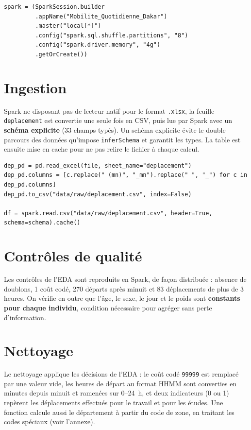 \documentclass[12pt,a4paper]{report}
\newcommand{\code}[1]{\texttt{\small #1}}
\newcommand{\1}{\mathbf{1}}
\begin{document}
\begin{lstlisting}[caption={Création de la session Spark},label={lst:session}]
spark = (SparkSession.builder
         .appName("Mobilite_Quotidienne_Dakar")
         .master("local[*]")
         .config("spark.sql.shuffle.partitions", "8")
         .config("spark.driver.memory", "4g")
         .getOrCreate())
\end{lstlisting}

\section{Ingestion}
Spark ne disposant pas de lecteur natif pour le format \code{.xlsx}, la feuille \code{deplacement} est convertie une seule fois en CSV, puis lue par Spark avec un \textbf{schéma explicite} (33 champs typés). Un schéma explicite évite le double parcours des données qu'impose \code{inferSchema} et garantit les types. La table est ensuite mise en cache pour ne pas relire le fichier à chaque calcul.

\begin{lstlisting}[caption={Lecture du CSV avec un schéma explicite},label={lst:ingestion}]
dep_pd = pd.read_excel(file, sheet_name="deplacement")
dep_pd.columns = [c.replace(" (mn)", "_mn").replace(" ", "_") for c in dep_pd.columns]
dep_pd.to_csv("data/raw/deplacement.csv", index=False)

df = spark.read.csv("data/raw/deplacement.csv", header=True, schema=schema).cache()
\end{lstlisting}

\section{Contrôles de qualité}
Les contrôles de l'EDA sont reproduits en Spark, de façon distribuée : absence de doublons, 1 coût codé, 270 départs après minuit et 83 déplacements de plus de 3 heures. On vérifie en outre que l'âge, le sexe, le jour et le poids sont \textbf{constants pour chaque individu}, condition nécessaire pour agréger sans perte d'information.

\section{Nettoyage}
Le nettoyage applique les décisions de l'EDA : le coût codé \code{99999} est remplacé par une valeur vide, les heures de départ au format HHMM sont converties en minutes depuis minuit et ramenées sur 0--24~h, et deux indicateurs (0 ou 1) repèrent les déplacements effectués pour le travail et pour les études. Une fonction calcule aussi le département à partir du code de zone, en traitant les codes spéciaux (voir l'annexe).
\end{document}
